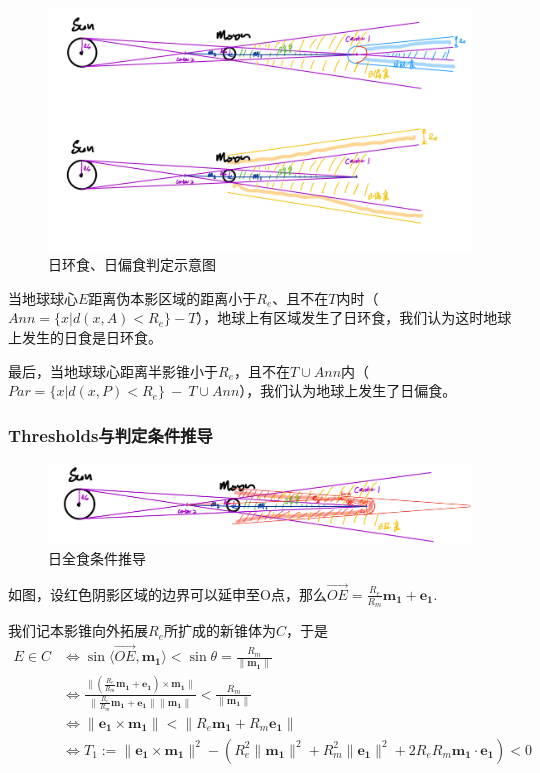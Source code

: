 \documentclass[hidelinks]{article}
\newcommand{\dps}{\displaystyle}
\newcommand{\vt}[1]{\mathbf{#1}}
\newcommand{\norm}[1]{\| #1 \|}
\begin{document}
\begin{figure}[H]
    \centering
    \includegraphics[width=0.8\linewidth]{images/annular_partial_eclipse.jpg}
    \caption{日环食、日偏食判定示意图}
    \label{fig:enter-label}
\end{figure}

当地球球心$E$距离伪本影区域的距离小于$R_e$、且不在$T$内时（$Ann = \{x | d(x, A)<R_e\} - T$），地球上有区域发生了日环食，我们认为这时地球上发生的日食是日环食。

最后，当地球球心距离半影锥小于$R_e$，且不在$T\cup Ann$内（$Par = \{x| d(x, P) < R_e\}\ -\ T\cup Ann$），我们认为地球上发生了日偏食。

\subsubsection{Thresholds与判定条件推导}

\begin{figure}[H]
    \centering
    \includegraphics[width=0.8\linewidth]{images/total_eclipse.jpg}
    \caption{日全食条件推导}
    \label{fig:enter-label}
\end{figure}

如图，设红色阴影区域的边界可以延申至O点，那么$\dps\overrightarrow{OE} = \frac{R_e}{R_m}\mathbf{m_1} + \mathbf{e_1}$. 

我们记本影锥向外拓展$R_e$所扩成的新锥体为$C$，于是
\begin{align}
E\in C & \Longleftrightarrow \sin\langle \overrightarrow{OE}, \mathbf{m_1}\rangle < \sin \theta = \frac{R_m}{\|\mathbf{m_1}\|}\\
& \Longleftrightarrow \frac{\| (\frac{R_e}{R_m}\mathbf{m_1} + \mathbf{e_1})\times \mathbf{m_1}\|}{\|\frac{R_e}{R_m}\mathbf{m_1} + \mathbf{e_1}\| \|\mathbf{m_1}\|} < \frac{R_m}{\|\mathbf{m_1}\|}\\
& \Longleftrightarrow \| \vt{e_1} \times \vt{m_1}\| < \norm{R_e\vt{m_1} + R_m\vt{e_1}}\\
& \Longleftrightarrow T_1 
 := \norm{\vt{e_1} \times \vt{m_1}}^2 - (R_e^2 \norm{\vt{m_1}}^2 + R_m^2 \norm{\vt{e_1}}^2 + 2R_e R_m \vt{m_1}\cdot \vt{e_1}) < 0
\end{align}
\end{document}
